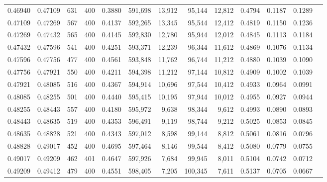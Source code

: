 \begin{tabular}{rrrrrrrrrrrrr}
0.46940 & 0.47109 &    631 & 400 &                                     0.3880 & 591,698 &  13,912 &  95,144 &  12,812 & 0.4794 & 0.1187 & 0.1289 \\
0.47109 & 0.47269 &    567 & 400 &                                     0.4137 & 592,265 &  13,345 &  95,544 &  12,412 & 0.4819 & 0.1150 & 0.1236 \\
0.47269 & 0.47432 &    565 & 400 &                                     0.4145 & 592,830 &  12,780 &  95,944 &  12,012 & 0.4845 & 0.1113 & 0.1184 \\
0.47432 & 0.47596 &    541 & 400 &                                     0.4251 & 593,371 &  12,239 &  96,344 &  11,612 & 0.4869 & 0.1076 & 0.1134 \\
0.47596 & 0.47756 &    477 & 400 &                                     0.4561 & 593,848 &  11,762 &  96,744 &  11,212 & 0.4880 & 0.1039 & 0.1090 \\
0.47756 & 0.47921 &    550 & 400 &                                     0.4211 & 594,398 &  11,212 &  97,144 &  10,812 & 0.4909 & 0.1002 & 0.1039 \\
0.47921 & 0.48085 &    516 & 400 &                                     0.4367 & 594,914 &  10,696 &  97,544 &  10,412 & 0.4933 & 0.0964 & 0.0991 \\
0.48085 & 0.48255 &    501 & 400 &                                     0.4440 & 595,415 &  10,195 &  97,944 &  10,012 & 0.4955 & 0.0927 & 0.0944 \\
0.48255 & 0.48443 &    557 & 400 &                                     0.4180 & 595,972 &   9,638 &  98,344 &   9,612 & 0.4993 & 0.0890 & 0.0893 \\
0.48443 & 0.48635 &    519 & 400 &                                     0.4353 & 596,491 &   9,119 &  98,744 &   9,212 & 0.5025 & 0.0853 & 0.0845 \\
0.48635 & 0.48828 &    521 & 400 &                                     0.4343 & 597,012 &   8,598 &  99,144 &   8,812 & 0.5061 & 0.0816 & 0.0796 \\
0.48828 & 0.49017 &    452 & 400 &                                     0.4695 & 597,464 &   8,146 &  99,544 &   8,412 & 0.5080 & 0.0779 & 0.0755 \\
0.49017 & 0.49209 &    462 & 401 &                                     0.4647 & 597,926 &   7,684 &  99,945 &   8,011 & 0.5104 & 0.0742 & 0.0712 \\
0.49209 & 0.49412 &    479 & 400 &                                     0.4551 & 598,405 &   7,205 & 100,345 &   7,611 & 0.5137 & 0.0705 & 0.0667 \\

\end{tabular}
